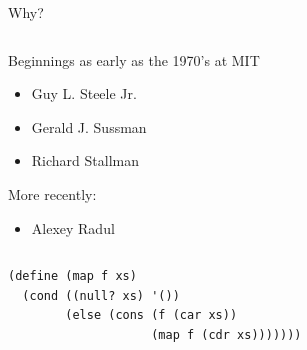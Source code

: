 \documentclass[usenames,dvipsnames,svgnames,table,aspectratio=1610,mathserif]{beamer}
\newcommand{\nl}{\vspace{\baselineskip}}
\begin{document}
\begin{frame}
\begin{columns}
\begin{column}{0.5\textwidth}
\begin{center}
      \nl

      Why?
    \end{center}
  \end{column}
\end{columns}

\end{frame}




\begin{frame}

\begin{columns}
\begin{column}{0.5\textwidth}
Beginnings as early as the 1970's at MIT
\begin{itemize}
  \item Guy L. Steele Jr. 
  \item Gerald J. Sussman
  \item Richard Stallman
\end{itemize}

\nl

More recently:
\begin{itemize}
  \item Alexey Radul
\end{itemize}
\end{column}
\begin{column}{0.5\textwidth}

\begin{figure}
\centering
\def\svgwidth{\columnwidth}

\end{figure}

\end{column}
\end{columns}

\end{frame}


\begin{frame}[fragile]

\begin{verbatim}
(define (map f xs)
  (cond ((null? xs) '())
        (else (cons (f (car xs))
                    (map f (cdr xs)))))))
\end{verbatim}
\end{frame}
\end{document}
